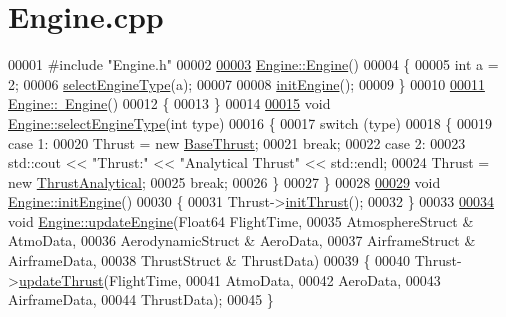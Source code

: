 \hypertarget{_engine_8cpp_source}{}\section{Engine.\+cpp}
\label{_engine_8cpp_source}

\begin{DoxyCode}
00001 \textcolor{preprocessor}{#include "Engine.h"}
00002 
\hyperlink{group___engine_a8c98683b0a3aa28d8ab72a8bcd0d52f2}{00003} \hyperlink{group___engine_a8c98683b0a3aa28d8ab72a8bcd0d52f2}{Engine::Engine}()
00004 \{
00005     \textcolor{keywordtype}{int} a = 2;
00006     \hyperlink{group___engine_ac33371d6fff86c0c8e14495f10046d9a}{selectEngineType}(a);
00007 
00008     \hyperlink{group___engine_aca6cc0dc7d537295123630a219142337}{initEngine}();
00009 \}
00010 
\hyperlink{group___engine_a8ef7030a089ecb30bbfcb9e43094717a}{00011} \hyperlink{group___engine_a8ef7030a089ecb30bbfcb9e43094717a}{Engine::~Engine}()
00012 \{
00013 \}
00014 
\hyperlink{group___engine_ac33371d6fff86c0c8e14495f10046d9a}{00015} \textcolor{keywordtype}{void} \hyperlink{group___engine_ac33371d6fff86c0c8e14495f10046d9a}{Engine::selectEngineType}(\textcolor{keywordtype}{int} type)
00016 \{
00017     \textcolor{keywordflow}{switch} (type)
00018     \{
00019     \textcolor{keywordflow}{case} 1:
00020         Thrust = \textcolor{keyword}{new} \hyperlink{group___engine_class_base_thrust}{BaseThrust}; 
00021         \textcolor{keywordflow}{break};
00022     \textcolor{keywordflow}{case} 2:
00023         std::cout << \textcolor{stringliteral}{"Thrust:"} << \textcolor{stringliteral}{"Analytical Thrust"} << std::endl;
00024         Thrust = \textcolor{keyword}{new} \hyperlink{group___engine_class_thrust_analytical}{ThrustAnalytical};
00025         \textcolor{keywordflow}{break};
00026     \}
00027 \}
00028 
\hyperlink{group___engine_aca6cc0dc7d537295123630a219142337}{00029} \textcolor{keywordtype}{void} \hyperlink{group___engine_aca6cc0dc7d537295123630a219142337}{Engine::initEngine}()
00030 \{
00031     Thrust->\hyperlink{group___engine_a1a9a88e6c05cc0b2564522347365900c}{initThrust}();
00032 \}
00033 
\hyperlink{group___engine_a9e16100ffd33cf8ec632257795c03865}{00034} \textcolor{keywordtype}{void} \hyperlink{group___engine_a9e16100ffd33cf8ec632257795c03865}{Engine::updateEngine}(Float64 FlightTime,
00035                         AtmosphereStruct & AtmoData,
00036                         AerodynamicStruct & AeroData,
00037                         AirframeStruct & AirframeData,
00038                         ThrustStruct & ThrustData)
00039 \{
00040     Thrust->\hyperlink{group___engine_a869359a1b2b7cddcbe5979d6a1cf5eac}{updateThrust}(FlightTime,
00041                          AtmoData,
00042                          AeroData,
00043                          AirframeData,
00044                          ThrustData);
00045 \}
\end{DoxyCode}
